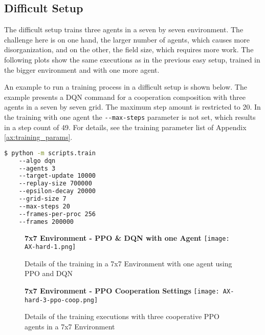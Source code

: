 \subsection{Difficult Setup}
The difficult setup trains three agents in a seven by seven environment. The challenge here is on one hand, the larger number of agents, which causes more disorganization, and on the other, the field size, which requires more work. The following plots show the same executions as in the previous easy setup, trained in the bigger environment and with one more agent.

An example to run a training process in a difficult setup is shown below. The example presents a DQN command for a cooperation composition with three agents in a seven by seven grid. The maximum step amount is restricted to 20. In the training with one agent the \verb|--max-steps| parameter is not set, which results in a step count of 49. For details, see the training parameter list of Appendix \ref{ax:training_params}.

\begin{lstlisting}[float=htp,caption=Exemplary command to execute training with three DQN agents in a difficult setup,label=lst:diff_command,language=bash ,xleftmargin=3ex,xrightmargin=1ex]
$ python -m scripts.train 
    --algo dqn 
    --agents 3
    --target-update 10000 
    --replay-size 700000 
    --epsilon-decay 20000
    --grid-size 7 
    --max-steps 20 
    --frames-per-proc 256
    --frames 200000
\end{lstlisting}

\newpage
\vfill
\begin{figure}
    \centering
    \textbf{7x7 Environment - PPO \& DQN with one Agent}
    \texttt{[image: AX-hard-1.png]}\\
    \caption[PPO and DQN Training Details with One Agent in a 7x7 Environment]{Details of the training in a 7x7 Environment with one agent using PPO and DQN}\label{fig:ax-hard-1}
\end{figure}
\vfill
\clearpage

\newpage
\vfill
\begin{figure}
    \centering
    \textbf{7x7 Environment - PPO Cooperation Settings}
    \texttt{[image: AX-hard-3-ppo-coop.png]}\\
    \caption[Training Details of PPO Cooperation Executions in a 7x7 Environment]{Details of the training executions with three cooperative PPO agents in a 7x7 Environment}\label{fig:ax-hard-2-ppo-coop}
\end{figure}
\vfill
\clearpage

